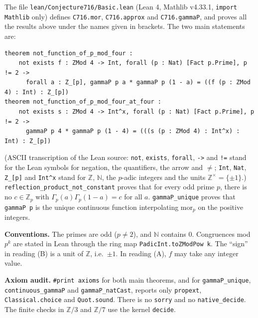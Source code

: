 \documentclass[11pt]{article}
\theoremstyle{definition}
\newcommand{\Zp}{\mathbb{Z}_p}
\begin{document}
The file \texttt{lean/Conjecture716/Basic.lean} (Lean 4, Mathlib v4.33.1, \texttt{import Mathlib}
only) defines \texttt{C716.mor}, \texttt{C716.approx} and \texttt{C716.gammaP}, and proves all the
results above under the names given in brackets. The two main statements are:
{\footnotesize
\begin{verbatim}
theorem not_function_of_p_mod_four :
    not exists f : ZMod 4 -> Int, forall (p : Nat) [Fact p.Prime], p != 2 ->
      forall a : Z_[p], gammaP p a * gammaP p (1 - a) = ((f (p : ZMod 4) : Int) : Z_[p])
theorem not_function_of_p_mod_four_at_four :
    not exists s : ZMod 4 -> Int^x, forall (p : Nat) [Fact p.Prime], p != 2 ->
      gammaP p 4 * gammaP p (1 - 4) = (((s (p : ZMod 4) : Int^x) : Int) : Z_[p])
\end{verbatim}
}
(ASCII transcription of the Lean source: \texttt{not}, \texttt{exists}, \texttt{forall},
\texttt{->} and \texttt{!=} stand for the Lean symbols for negation, the quantifiers, the
arrow and $\ne$; \texttt{Int}, \texttt{Nat}, \texttt{Z\_[p]} and \texttt{Int\^{}x} stand for
$\mathbb{Z}$, $\mathbb{N}$, the $p$-adic integers and the units $\mathbb{Z}^\times = \{\pm1\}$.)
\texttt{reflection\_product\_not\_constant} proves that for every odd prime $p$, there is no $c \in \Zp$
with $\Gamma_p(a)\Gamma_p(1-a) = c$ for all $a$. \texttt{gammaP\_unique} proves that \texttt{gammaP p} is the
unique continuous function interpolating $\mathrm{mor}_p$ on the positive integers.

\textbf{Conventions.} The primes are odd ($p \ne 2$), and $\mathbb{N}$ contains $0$.
Congruences mod $p^k$ are stated in Lean through the ring map \texttt{PadicInt.toZModPow k}.
The ``sign'' in reading (B) is a unit of $\mathbb{Z}$, i.e.\ $\pm 1$. In reading (A), $f$ may
take any integer value.

\textbf{Axiom audit.} \texttt{\#print axioms} for both main theorems, and for
\texttt{gammaP\_unique}, \texttt{continuous\_gammaP} and \texttt{gammaP\_natCast}, reports only
\texttt{propext}, \texttt{Classical.choice} and \texttt{Quot.sound}. There is no \texttt{sorry}
and no \texttt{native\_decide}. The finite checks in $\mathbb{Z}/3$ and $\mathbb{Z}/7$ use the
kernel \texttt{decide}.
\end{document}
